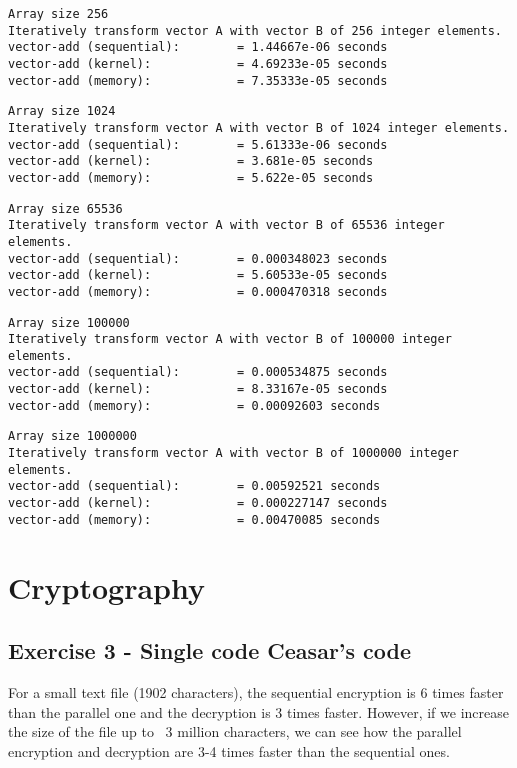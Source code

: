 \documentclass[a4paper]{article}
\begin{document}
\begin{verbatim}
Array size 256
Iteratively transform vector A with vector B of 256 integer elements.
vector-add (sequential):        = 1.44667e-06 seconds
vector-add (kernel):            = 4.69233e-05 seconds
vector-add (memory):            = 7.35333e-05 seconds
\end{verbatim}
\begin{verbatim}
Array size 1024
Iteratively transform vector A with vector B of 1024 integer elements.
vector-add (sequential):        = 5.61333e-06 seconds
vector-add (kernel):            = 3.681e-05 seconds
vector-add (memory):            = 5.622e-05 seconds
\end{verbatim}
\begin{verbatim}
Array size 65536
Iteratively transform vector A with vector B of 65536 integer elements.
vector-add (sequential):        = 0.000348023 seconds
vector-add (kernel):            = 5.60533e-05 seconds
vector-add (memory):            = 0.000470318 seconds
\end{verbatim}
\begin{verbatim}
Array size 100000
Iteratively transform vector A with vector B of 100000 integer elements.
vector-add (sequential):        = 0.000534875 seconds
vector-add (kernel):            = 8.33167e-05 seconds
vector-add (memory):            = 0.00092603 seconds
\end{verbatim}
\begin{verbatim}
Array size 1000000
Iteratively transform vector A with vector B of 1000000 integer elements.
vector-add (sequential):        = 0.00592521 seconds
vector-add (kernel):            = 0.000227147 seconds
vector-add (memory):            = 0.00470085 seconds
\end{verbatim}


\section{Cryptography}

\subsection{Exercise 3 - Single code Ceasar's code}

For a small text file (1902 characters), the sequential encryption is 6 times faster than the parallel one and the decryption is 3 times faster. However, if we increase the size of the file up to ~3 million characters, we can see how the parallel encryption and decryption are 3-4 times faster than the sequential ones.
\end{document}
